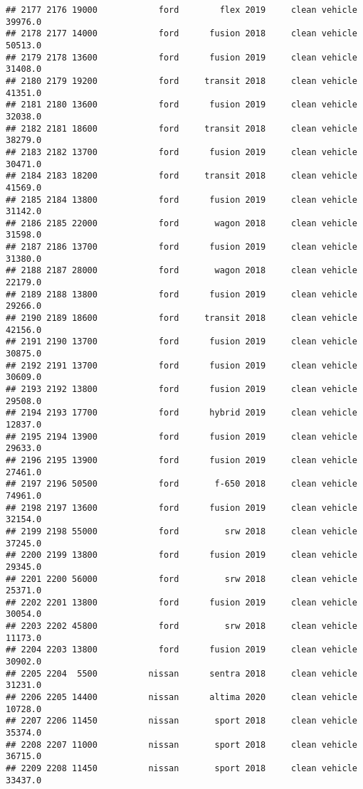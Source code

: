 \documentclass[
]{article}
\begin{document}
\begin{verbatim}
## 2177 2176 19000            ford        flex 2019     clean vehicle   39976.0
## 2178 2177 14000            ford      fusion 2018     clean vehicle   50513.0
## 2179 2178 13600            ford      fusion 2019     clean vehicle   31408.0
## 2180 2179 19200            ford     transit 2018     clean vehicle   41351.0
## 2181 2180 13600            ford      fusion 2019     clean vehicle   32038.0
## 2182 2181 18600            ford     transit 2018     clean vehicle   38279.0
## 2183 2182 13700            ford      fusion 2019     clean vehicle   30471.0
## 2184 2183 18200            ford     transit 2018     clean vehicle   41569.0
## 2185 2184 13800            ford      fusion 2019     clean vehicle   31142.0
## 2186 2185 22000            ford       wagon 2018     clean vehicle   31598.0
## 2187 2186 13700            ford      fusion 2019     clean vehicle   31380.0
## 2188 2187 28000            ford       wagon 2018     clean vehicle   22179.0
## 2189 2188 13800            ford      fusion 2019     clean vehicle   29266.0
## 2190 2189 18600            ford     transit 2018     clean vehicle   42156.0
## 2191 2190 13700            ford      fusion 2019     clean vehicle   30875.0
## 2192 2191 13700            ford      fusion 2019     clean vehicle   30609.0
## 2193 2192 13800            ford      fusion 2019     clean vehicle   29508.0
## 2194 2193 17700            ford      hybrid 2019     clean vehicle   12837.0
## 2195 2194 13900            ford      fusion 2019     clean vehicle   29633.0
## 2196 2195 13900            ford      fusion 2019     clean vehicle   27461.0
## 2197 2196 50500            ford       f-650 2018     clean vehicle   74961.0
## 2198 2197 13600            ford      fusion 2019     clean vehicle   32154.0
## 2199 2198 55000            ford         srw 2018     clean vehicle   37245.0
## 2200 2199 13800            ford      fusion 2019     clean vehicle   29345.0
## 2201 2200 56000            ford         srw 2018     clean vehicle   25371.0
## 2202 2201 13800            ford      fusion 2019     clean vehicle   30054.0
## 2203 2202 45800            ford         srw 2018     clean vehicle   11173.0
## 2204 2203 13800            ford      fusion 2019     clean vehicle   30902.0
## 2205 2204  5500          nissan      sentra 2018     clean vehicle   31231.0
## 2206 2205 14400          nissan      altima 2020     clean vehicle   10728.0
## 2207 2206 11450          nissan       sport 2018     clean vehicle   35374.0
## 2208 2207 11000          nissan       sport 2018     clean vehicle   36715.0
## 2209 2208 11450          nissan       sport 2018     clean vehicle   33437.0

\end{verbatim}
\end{document}
